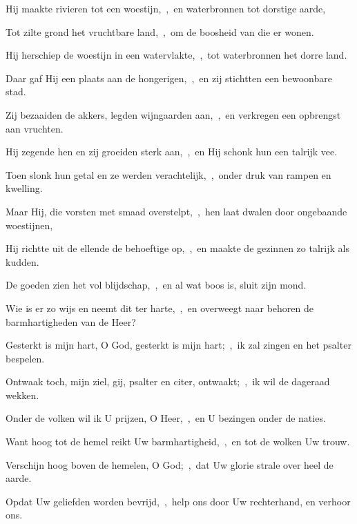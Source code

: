\documentclass[12pt,twoside,a5paper]{article}
\begin{document}
\begin{halfparskip}
  Hij maakte rivieren tot een woestijn,~\sep\ en waterbronnen tot dorstige aarde,

  Tot zilte grond het vruchtbare land,~\sep\ om de boosheid van die er wonen.

  Hij herschiep de woestijn in een watervlakte,~\sep\ tot waterbronnen het dorre land.

  Daar gaf Hij een plaats aan de hongerigen,~\sep\ en zij stichtten een bewoonbare stad.

  Zij bezaaiden de akkers, legden wijngaarden aan,~\sep\ en verkregen een opbrengst aan vruchten.

  Hij zegende hen en zij groeiden sterk aan,~\sep\ en Hij schonk hun een talrijk vee.

  Toen slonk hun getal en ze werden verachtelijk,~\sep\ onder druk van rampen en kwelling.

  Maar Hij, die vorsten met smaad overstelpt,~\sep\ hen laat dwalen door ongebaande woestijnen,

  Hij richtte uit de ellende de behoeftige op,~\sep\ en maakte de gezinnen zo talrijk als kudden.

  De goeden zien het vol blijdschap,~\sep\ en al wat boos is, sluit zijn mond.

  Wie is er zo wijs en neemt dit ter harte,~\sep\ en overweegt naar behoren de barmhartigheden van de Heer?
\end{halfparskip}



\begin{halfparskip}
  Gesterkt is mijn hart, O God, gesterkt is mijn hart;~\sep\ ik zal zingen en het psalter bespelen.


  Ontwaak toch, mijn ziel, gij, psalter en citer, ontwaakt;~\sep\ ik wil de dageraad wekken.

  Onder de volken wil ik U prijzen, O Heer,~\sep\ en U bezingen onder de naties.

  Want hoog tot de hemel reikt Uw barmhartigheid,~\sep\ en tot de wolken Uw trouw.

  Verschijn hoog boven de hemelen, O God;~\sep\ dat Uw glorie strale over heel de aarde.

  Opdat Uw geliefden worden bevrijd,~\sep\ help ons door Uw rechterhand, en verhoor ons.
\end{halfparskip}
\end{document}
